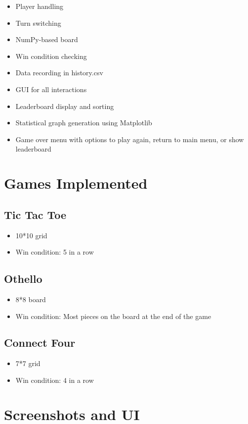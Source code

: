 \documentclass[12pt]{article} %
\begin{document}
\begin{itemize}
    \item Player handling
    \item Turn switching
    \item NumPy-based board
    \item Win condition checking
    \item Data recording in history.csv
    \item GUI for all interactions
    \item Leaderboard display and sorting
    \item Statistical graph generation using Matplotlib
    \item Game over menu with options to play again, return to main menu, or show leaderboard
\end{itemize}

\section{Games Implemented}

\subsection{Tic Tac Toe}
\begin{itemize}
    \item 10*10 grid
    \item Win condition: 5 in a row
\end{itemize}

\subsection{Othello}
\begin{itemize}
    \item 8*8 board
    \item Win condition: Most pieces on the board at the end of the game
\end{itemize}

\subsection{Connect Four}
\begin{itemize}
    \item 7*7 grid
    \item Win condition: 4 in a row
\end{itemize}

\section{Screenshots and UI}
\end{document}
